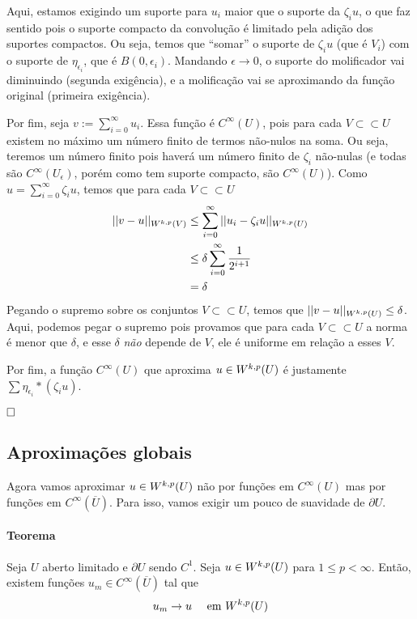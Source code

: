 \documentclass[a4paper, 11pt]{book}
\newcommand{\qed}{$\hfill\square$}
\newcommand{\pu}{\partial U}
\newcommand{\e}{\epsilon}
\begin{document}
Aqui, estamos exigindo um suporte para \( u_i \) maior que o suporte da \( \zeta_iu \), o que faz sentido pois o suporte compacto da convolução é limitado pela adição dos suportes compactos. Ou seja, temos que ``somar'' o suporte de \( \zeta_iu \) (que é \( V_i \)) com o suporte de \( \eta_{\e_i} \), que é \( B(0, \e_i) \). Mandando \( \e\rightarrow 0 \), o suporte do molificador vai diminuindo (segunda exigência), e a molificação vai se aproximando da função original (primeira exigência).

Por fim, seja $ v:=\sum_{i=0}^{\infty} u_i $. Essa função é \( C^\infty(U) \), pois para cada \( V \subset\subset U \) existem no máximo um número finito de termos não-nulos na soma. Ou seja, teremos um número finito pois haverá um número finito de \( \zeta_i \) não-nulas (e todas são \( C^\infty (U_\e) \), porém como tem suporte compacto, são \( C^\infty(U) \)). Como \( u=\sum_{i=0}^{\infty}\zeta_iu  \), temos que para cada \( V \subset\subset U \) 
\begin{align*}
	||v - u||_{W^{k,p}(V)} &\leq \sum_{i=0}^{\infty} ||u_i - \zeta_iu||_{W^{k,p}(U)} \\
	&\leq \delta  \sum_{i=0}^{\infty}  \frac{1}{2^{i+1}}\\
	&= \delta
\end{align*} Pegando o supremo sobre os conjuntos \( V \subset\subset U \), temos que \( ||v-u||_{W^{k,p}(U)} \leq \delta \). Aqui, podemos pegar o supremo pois provamos que para cada \( V \subset\subset U \) a norma é menor que \( \delta \), e esse \( \delta \) \textit{não} depende de \( V \), ele é uniforme em relação a esses \( V \).

Por fim, a função \( C^{\infty}(U) \) que aproxima \( u \in W^{k,p}(U) \) é justamente \( \sum \eta_{\e_i} * (\zeta_i u) \).

\qed




\subsection{Aproximações globais}

Agora vamos aproximar \( u \in W^{k,p}(U) \) não por funções em \( C^\infty(U) \) mas por funções em \( C^\infty(\overline{U}) \). Para isso, vamos exigir um pouco de suavidade de \( \pu \).

\paragraph{Teorema} Seja \( U \) aberto limitado e \( \pu \) sendo \( C^1 \). Seja \( u \in W^{k,p}(U) \) para \( 1 \leq p < \infty \). Então, existem funções \( u_m \in C^\infty(\overline{U}) \) tal que \[ u_m \rightarrow u \quad \text{ em }W^{k,p}(U) \]
\end{document}
